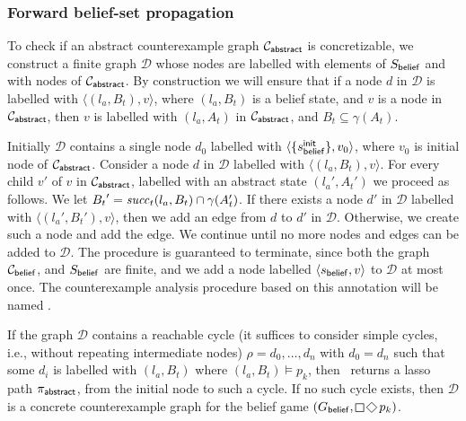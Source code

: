 \subsubsection{Forward belief-set propagation}

To check if an abstract counterexample graph $\mathcal{C}_{\mathsf{abstract}}$ is concretizable, we construct a finite graph $\mathcal{D}$ whose nodes are labelled with elements of $S_{\mathsf{belief}}$ and with nodes of $\mathcal{C}_{\mathsf{abstract}}$.
By construction we will ensure that if a node $d$ in $\mathcal D$ is labelled with $\langle(l_a,B_t),v \rangle$, where $(l_a,B_t)$ is a belief state, and $v$ is a node in $\mathcal{C}_{\mathsf{abstract}}$, then $v$ is labelled with $(l_a,A_t)$ in $\mathcal{C}_{\mathsf{abstract}}$, and $B_t \subseteq \gamma(A_t)$. 

Initially $\mathcal D$ contains a single node $d_0$ labelled with $\langle\{s_{\mathsf{belief}}^{\mathsf{init}}\},v_0\rangle$, where $v_0$ is initial node of $\mathcal{C}_{\mathsf{abstract}}$. Consider a node $d$ in $\mathcal D$ labelled with $\langle(l_a,B_t),v \rangle$. For every child $v'$ of $v$ in $\mathcal{C}_{\mathsf{abstract}}$, labelled with an abstract state $(l_a',A_t')$ we proceed as follows. We let ${B_t}' = \mathit{succ}_t(l_a,B_t) \cap \gamma(A_t')$. If there exists a node $d'$ in $\mathcal D$ labelled with $\langle (l_a',B_t'),v\rangle$, then we add an edge from $d$ to $d'$ in $\mathcal{D}$. Otherwise, we create such a node and add the edge. We continue until no more nodes and edges can be added to $\mathcal D$. The procedure is guaranteed to terminate, since both  the graph $\mathcal{C}_{\mathsf{belief}}$, and $S_{\mathsf{belief}}$ are finite, and we add a node labelled $\langle s_{\mathsf{belief}}, v\rangle$ to $\mathcal D$ at most once. The counterexample analysis procedure based on this annotation will be named \cexliveness.

If the graph $\mathcal D$ contains a reachable cycle (it suffices to consider simple cycles, i.e., without repeating intermediate nodes) $\rho = d_0,\ldots,d_n$ with $d_0 = d_n$ such that some $d_i$ is labelled with $(l_a,B_t)$ where $(l_a,B_t) \models p_k$, then 
\cexliveness\ returns a lasso path $\pi_{\mathsf{abstract}}$, from the initial node to such a cycle.
 If no such cycle exists, then $\mathcal D$ is a concrete counterexample graph for the belief game $(G_\belief,\LTLglobally\LTLfinally p_k)$. 

